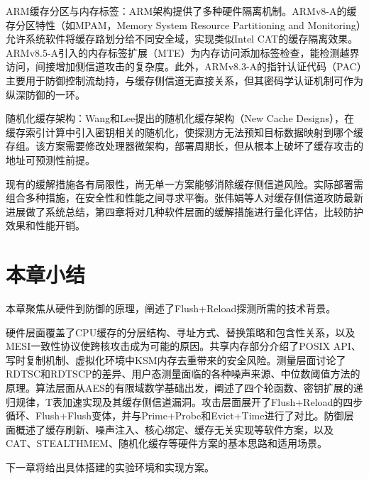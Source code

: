 ARM缓存分区与内存标签：ARM架构提供了多种硬件隔离机制。ARMv8-A的缓存分区特性（如MPAM，Memory System Resource Partitioning and Monitoring）允许系统软件将缓存路划分给不同安全域，实现类似Intel CAT的缓存隔离效果。ARMv8.5-A引入的内存标签扩展（MTE）为内存访问添加标签检查，能检测越界访问，间接增加侧信道攻击的复杂度。此外，ARMv8.3-A的指针认证代码（PAC）主要用于防御控制流劫持，与缓存侧信道无直接关系，但其密码学认证机制可作为纵深防御的一环。

随机化缓存架构：Wang和Lee提出的随机化缓存架构（New Cache Designs），在缓存索引计算中引入密钥相关的随机化，使探测方无法预知目标数据映射到哪个缓存组。该方案需要修改处理器微架构，部署周期长，但从根本上破坏了缓存攻击的地址可预测性前提。

现有的缓解措施各有局限性，尚无单一方案能够消除缓存侧信道风险。实际部署需组合多种措施，在安全性和性能之间寻求平衡。张伟娟等人对缓存侧信道攻防最新进展做了系统总结，第四章将对几种软件层面的缓解措施进行量化评估，比较防护效果和性能开销。

\section{本章小结}

本章聚焦从硬件到防御的原理，阐述了Flush+Reload探测所需的技术背景。

硬件层面覆盖了CPU缓存的分层结构、寻址方式、替换策略和包含性关系，以及MESI一致性协议使跨核攻击成为可能的原因。共享内存部分介绍了POSIX API、写时复制机制、虚拟化环境中KSM内存去重带来的安全风险。测量层面讨论了RDTSC和RDTSCP的差异、用户态测量面临的各种噪声来源、中位数阈值方法的原理。算法层面从AES的有限域数学基础出发，阐述了四个轮函数、密钥扩展的递归规律，T表加速实现及其缓存侧信道漏洞。攻击层面展开了Flush+Reload的四步循环、Flush+Flush变体，并与Prime+Probe和Evict+Time进行了对比。防御层面概述了缓存刷新、噪声注入、核心绑定、缓存无关实现等软件方案，以及CAT、STEALTHMEM、随机化缓存等硬件方案的基本思路和适用场景。

下一章将给出具体搭建的实验环境和实现方案。
